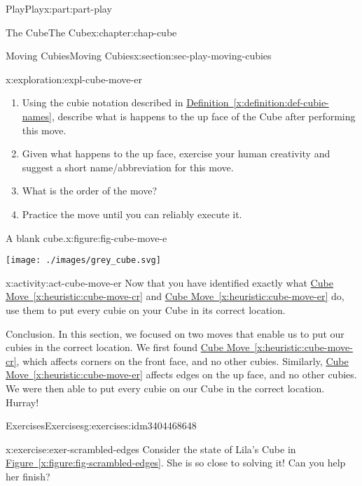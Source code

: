 \documentclass[oneside,10pt,]{book}
\newcommand{\xreffont}{\relax}
\numberwithin{equation}{section}
\begin{document}
\begin{partptx}{Play}{}{Play}{}{}{x:part:part-play}
\begin{chapterptx}{The Cube}{}{The Cube}{}{}{x:chapter:chap-cube}
\begin{sectionptx}{Moving Cubies}{}{Moving Cubies}{}{}{x:section:sec-play-moving-cubies}
\begin{exploration}{}{x:exploration:expl-cube-move-er}
\begin{enumerate}
\item{}Using the cubie notation described in \hyperref[x:definition:def-cubie-names]{Definition~{\xreffont\ref{x:definition:def-cubie-names}}}, describe what is happens to the up face of the Cube after performing this move.%
\item{}Given what happens to the up face, exercise your human creativity and suggest a short name\slash{}abbreviation for this move.%
\item{}What is the order of the move?%
\item{}Practice the move until you can reliably execute it.%
\end{enumerate}
\begin{figureptx}{A blank cube.}{x:figure:fig-cube-move-e}{}%
\begin{image}{0.25}{0.5}{0.25}%
\texttt{[image: ./images/grey\_cube.svg]}
\end{image}%
\tcblower
\end{figureptx}%
\end{exploration}%
\begin{activity}{}{x:activity:act-cube-move-er}%
Now that you have identified exactly what \hyperref[x:heuristic:cube-move-cr]{Cube Move~{\xreffont\ref{x:heuristic:cube-move-cr}}} and \hyperref[x:heuristic:cube-move-er]{Cube Move~{\xreffont\ref{x:heuristic:cube-move-er}}} do, use them to put every cubie on your Cube in its correct location.%
\end{activity}%
\begin{conclusion}{Conclusion.}%
In this section, we focused on two moves that enable us to put our cubies in the correct location. We first found \hyperref[x:heuristic:cube-move-cr]{Cube Move~{\xreffont\ref{x:heuristic:cube-move-cr}}}, which affects corners on the front face, and no other cubies. Similarly, \hyperref[x:heuristic:cube-move-er]{Cube Move~{\xreffont\ref{x:heuristic:cube-move-er}}} affects edges on the up face, and no other cubies. We were then able to put every cubie on our Cube in the correct location. Hurray!%
\end{conclusion}%
%
%
\typeout{************************************************}
\typeout{************************************************}
%
\begin{exercises-subsection-numberless}{Exercises}{}{Exercises}{}{}{g:exercises:idm3404468648}
\begin{divisionexercise}{1}{}{}{x:exercise:exer-scrambled-edges}%
Consider the state of Lila's Cube in \hyperref[x:figure:fig-scrambled-edges]{Figure~{\xreffont\ref{x:figure:fig-scrambled-edges}}}. She is so close to solving it! Can you help her finish?%

\end{divisionexercise}
\end{exercises-subsection-numberless}
\end{sectionptx}
\end{chapterptx}
\end{partptx}
\end{document}
